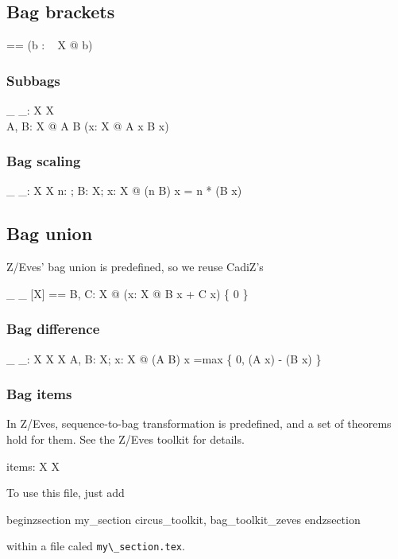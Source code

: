 \documentclass[draft,a4paper,10pt,wd]{article}
\begin{document}
\subsection*{Bag brackets}

\begin{zed}
\lbag \listarg \rbag [ X ]  == (\lambda b : \bag~ X @ b)
\end{zed}

\subsubsection*{Subbags}

\begin{gendef}[X]
  \_ \subbageq \_: \bag X \rel \bag X \\
\where
  \forall A, B: \bag X @ A \subbageq B \iff
	(\forall x: X @ A \bcount x \leq B \bcount x)
\end{gendef}

\subsubsection*{Bag scaling}

\begin{gendef}[X]
  \_ \otimes \_: \nat \cross \bag X \fun \bag X
\where
  \forall n: \nat; B: \bag X; x: X @
     (n \otimes B) \bcount x = n * (B \bcount x)
\end{gendef}

\subsection*{Bag union }

Z/Eves' bag union is predefined, so we reuse CadiZ's
\begin{zed}
\_ \uplus \_ [X] == \lambda B, C: \bag X @ (\lambda x: X @ B \bcount x + C \bcount x) \nrres \{ 0 \}
\end{zed}

\subsubsection*{Bag difference}

\begin{gendef}[X]
  \_ \uminus \_: \bag X \cross \bag X \fun \bag X
\where
  \forall A, B: \bag X; x: X @
     (A \uminus B) \bcount x =max \{ 0, (A \bcount x) - (B \bcount x) \}
\end{gendef}

\subsubsection*{Bag items}

In Z/Eves, sequence-to-bag transformation is predefined, and a set
of theorems hold for them. See the Z/Eves toolkit for details.
%
\begin{gendef}[X]
  items: \seq X \fun \bag X
\end{gendef}

To use this file, just add

begin{zsection}
\SECTION my\_section \parents circus\_toolkit, bag\_toolkit\_zeves
end{zsection}

within a file caled \verb'my\_section.tex'.
\end{document}
